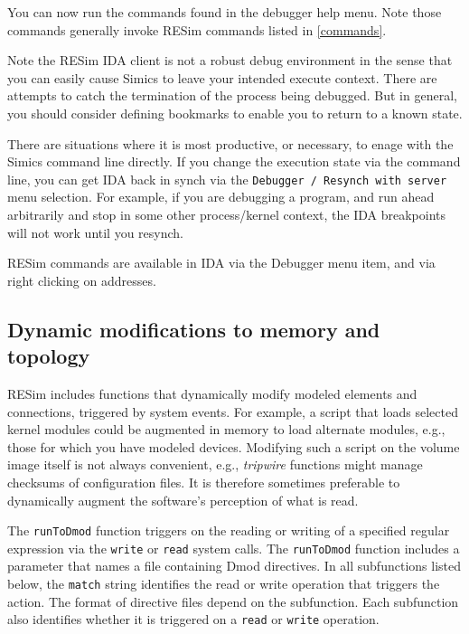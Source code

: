 \documentclass[titlepage]{article}
\begin{document}
You can now run the commands found in the debugger help menu.  Note those commands generally invoke RESim commands listed in \ref{commands}.

Note the RESim IDA client is not a robust debug environment in the sense that you can easily cause Simics to leave your intended execute context.
There are attempts to catch the termination of the process being debugged.  But in general, you should consider defining bookmarks to enable you to
return to a known state.  

There are situations where it is most productive, or necessary, to enage with the Simics command line directly.  If you change the execution state
via the command line, you can get IDA back in synch via the {\tt Debugger / Resynch with server} menu selection.
For example, if you are debugging a program,
and run ahead arbitrarily and stop in some other process/kernel context, the IDA breakpoints will not work until you resynch.

RESim commands are available in IDA via the Debugger menu item, and via right clicking on addresses.  

\subsection{Dynamic modifications to memory and topology}
\label{dmod}
RESim includes functions that dynamically modify modeled elements and connections,
triggered by system events.  For example, a script that loads selected kernel modules could be augmented in memory to
load alternate modules, e.g., those for which you have modeled devices.  Modifying such a script on the volume
image itself is not always convenient, e.g., \textit{tripwire} functions might manage checksums of
configuration files.  It is therefore sometimes preferable to dynamically augment the software's perception of what is read.

The {\tt runToDmod} function triggers on the reading or writing of a specified
regular expression via the {\tt write} or {\tt read} system calls.  
The {\tt runToDmod} function includes a parameter that names a file containing
Dmod directives.  In all subfunctions listed
below, the {\tt match} string identifies the read or write operation that triggers the action. 
The format of directive files depend on the subfunction.  Each subfunction also identifies whether it is
triggered on a {\tt read} or {\tt write} operation. 
 
\end{document}
